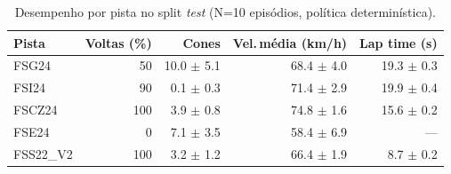 \begin{table}[H]
\centering
\caption{Desempenho por pista no split \textit{test} (N=10 episódios, política determinística).}
\label{tab:per_track_test}
\begin{tabular}{lrrrr}
\toprule
\textbf{Pista} & \textbf{Voltas (\%)} & \textbf{Cones} & \textbf{Vel.\,m\'edia (km/h)} & \textbf{Lap time (s)} \\
\midrule
FSG24 & 50 & 10.0 $\pm$ 5.1 & 68.4 $\pm$ 4.0 & 19.3 $\pm$ 0.3 \\
FSI24 & 90 & 0.1 $\pm$ 0.3 & 71.4 $\pm$ 2.9 & 19.9 $\pm$ 0.4 \\
FSCZ24 & 100 & 3.9 $\pm$ 0.8 & 74.8 $\pm$ 1.6 & 15.6 $\pm$ 0.2 \\
FSE24 & 0 & 7.1 $\pm$ 3.5 & 58.4 $\pm$ 6.9 & --- \\
FSS22_V2 & 100 & 3.2 $\pm$ 1.2 & 66.4 $\pm$ 1.9 & 8.7 $\pm$ 0.2 \\
\bottomrule
\end{tabular}
\end{table}
